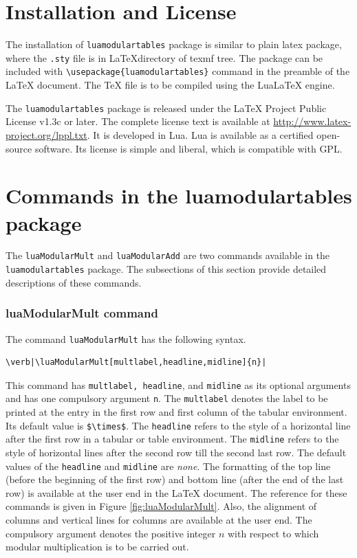 ﻿\documentclass{article}
\begin{document}
\section{Installation and License}

The installation of \verb|luamodulartables| package is similar to plain latex package, where the \texttt{.sty} file is in \LaTeX directory of texmf tree. The package can be included with \verb|\usepackage{luamodulartables}| command in the preamble of the LaTeX document. The TeX file is to be compiled using the LuaLaTeX engine.


The \verb|luamodulartables| package is released under the LaTeX Project Public License v1.3c or later. The complete license text is available at \url{http://www.latex-project.org/lppl.txt}. It is developed in Lua.  Lua is available as a certified open-source software. Its license is simple and liberal, which is compatible with GPL.

\section{Commands in the luamodulartables package}
The \texttt{luaModularMult} and \texttt{luaModularAdd} are two commands available in the \verb|luamodulartables| package. The subsections of this section provide detailed descriptions of these commands.
\subsubsection{luaModularMult command}
The command \verb|luaModularMult| has the following syntax. 
\begin{verbatim}
\verb|\luaModularMult[multlabel,headline,midline]{n}| 
\end{verbatim}
This command has \texttt{multlabel, headline}, and \texttt{midline} as its optional arguments and has one compulsory argument \verb|n|. The \verb|multlabel| denotes the label to be printed at the entry in the first row and first column of the tabular environment. Its default value is \verb|$\times$|. The \verb|headline| refers to the style of a horizontal line after the first row in a tabular or table environment. The \verb|midline| refers to the style of horizontal lines after the second row till the second last row. The default values of the \verb|headline| and \verb|midline| are \emph{none}. The formatting of the top line (before the beginning of the first row) and bottom line (after the end of the last row) is available at  the user end in the LaTeX document. The reference for these commands is given in Figure \ref{fig:luaModularMult}. Also, the alignment of columns and vertical lines for columns are available at the user end. The compulsory argument denotes the positive integer \(n\) with respect to which modular multiplication is to be carried out.
\end{document}
